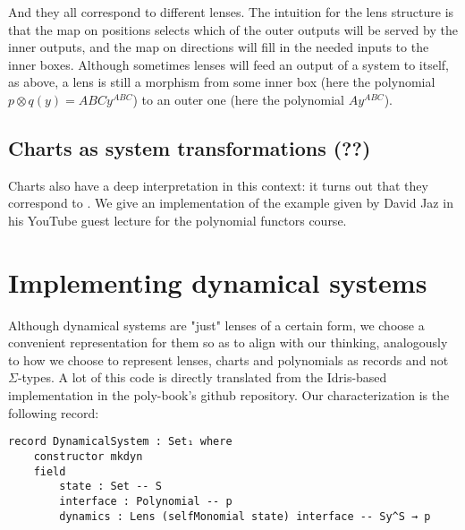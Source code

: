 And they all correspond to different lenses. The intuition for the lens structure is that the map on positions selects which of the outer outputs will be served by the inner outputs, and the map on directions will fill in the needed inputs to the inner boxes. Although sometimes lenses will feed an output of a system to itself, as above, a lens is still a morphism from some inner box (here the polynomial $p \otimes q(y) = ABCy^{ABC}$) to an outer one (here the polynomial $Ay^{ABC}$).

\subsection{Charts as system transformations (??)}

Charts also have a deep interpretation in this context: it turns out that they correspond to . We give an implementation of the example given by David Jaz in his YouTube guest lecture for the polynomial functors course.

\section{Implementing dynamical systems}

Although dynamical systems are "just" lenses of a certain form, we choose a convenient representation for them so as to align with our thinking, analogously to how we choose to represent lenses, charts and polynomials as records and not $\Sigma$-types. A lot of this code is directly translated from the Idris-based implementation in the poly-book's github repository. Our characterization is the following record:
\begin{verbatim}
record DynamicalSystem : Set₁ where
    constructor mkdyn
    field
        state : Set -- S
        interface : Polynomial -- p
        dynamics : Lens (selfMonomial state) interface -- Sy^S → p
\end{verbatim}

